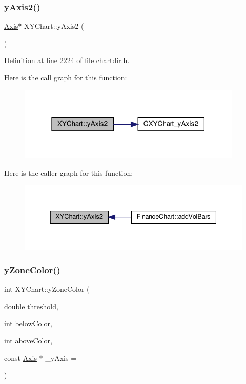 \subsubsection{\texorpdfstring{y\+Axis2()}{yAxis2()}}
{\footnotesize\ttfamily \hyperlink{class_axis}{Axis}$\ast$ X\+Y\+Chart\+::y\+Axis2 (\begin{DoxyParamCaption}{ }\end{DoxyParamCaption})\hspace{0.3cm}{\ttfamily [inline]}}



Definition at line 2224 of file chartdir.\+h.

Here is the call graph for this function\+:
\nopagebreak
\begin{figure}[H]
\begin{center}
\leavevmode
\includegraphics[width=303pt]{class_x_y_chart_aaddf44015a8d6eb406c548ea4b644d5c_cgraph}
\end{center}
\end{figure}
Here is the caller graph for this function\+:
\nopagebreak
\begin{figure}[H]
\begin{center}
\leavevmode
\includegraphics[width=337pt]{class_x_y_chart_aaddf44015a8d6eb406c548ea4b644d5c_icgraph}
\end{center}
\end{figure}
\mbox{\label{class_x_y_chart_a5501b16635ca95921bf9aa74621a3793}} 
\subsubsection{\texorpdfstring{y\+Zone\+Color()}{yZoneColor()}}
{\footnotesize\ttfamily int X\+Y\+Chart\+::y\+Zone\+Color (\begin{DoxyParamCaption}\item[{double}]{threshold,  }\item[{int}]{below\+Color,  }\item[{int}]{above\+Color,  }\item[{const \hyperlink{class_axis}{Axis} $\ast$}]{\+\_\+y\+Axis = {} }\end{DoxyParamCaption})\hspace{0.3cm}{\ttfamily [inline]}}



